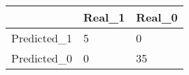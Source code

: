 \begin{tabular}{lll}
& Real_1 & Real_0 \\ 
\hline 
Predicted_1 & 5 & 0 \\ 
Predicted_0 & 0 & 35 \\ 
\hline 
\end{tabular}